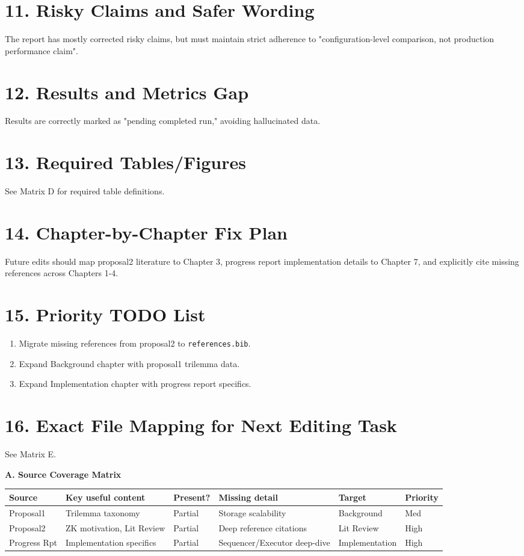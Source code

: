 \documentclass[12pt]{article}
\begin{document}
\section{11. Risky Claims and Safer Wording}
The report has mostly corrected risky claims, but must maintain strict adherence to "configuration-level comparison, not production performance claim".

\section{12. Results and Metrics Gap}
Results are correctly marked as "pending completed run," avoiding hallucinated data.

\section{13. Required Tables/Figures}
See Matrix D for required table definitions.

\section{14. Chapter-by-Chapter Fix Plan}
Future edits should map proposal2 literature to Chapter 3, progress report implementation details to Chapter 7, and explicitly cite missing references across Chapters 1-4.

\section{15. Priority TODO List}
\begin{enumerate}
    \item Migrate missing references from proposal2 to \texttt{references.bib}.
    \item Expand Background chapter with proposal1 trilemma data.
    \item Expand Implementation chapter with progress report specifics.
\end{enumerate}

\section{16. Exact File Mapping for Next Editing Task}
See Matrix E.

\vspace{2em}
\noindent\textbf{A. Source Coverage Matrix} \\
\begin{tabularx}{\textwidth}{|l|X|l|X|l|l|}
\hline
\textbf{Source} & \textbf{Key useful content} & \textbf{Present?} & \textbf{Missing detail} & \textbf{Target} & \textbf{Priority} \\ \hline
Proposal1 & Trilemma taxonomy & Partial & Storage scalability & Background & Med \\ \hline
Proposal2 & ZK motivation, Lit Review & Partial & Deep reference citations & Lit Review & High \\ \hline
Progress Rpt & Implementation specifics & Partial & Sequencer/Executor deep-dive & Implementation & High \\ \hline
\end{tabularx}
\end{document}
